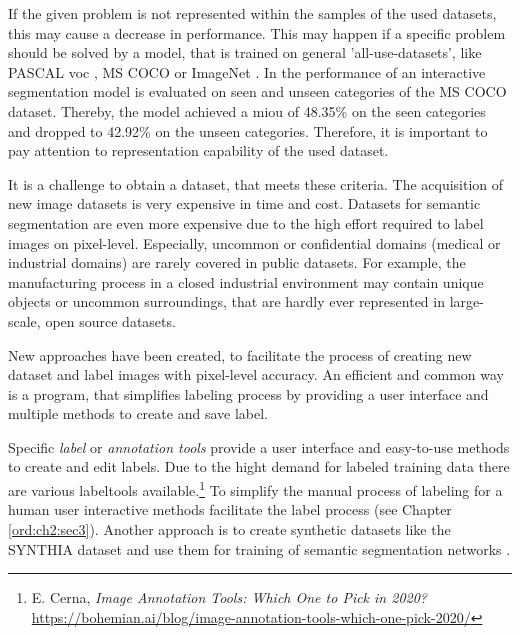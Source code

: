 \begin{itemize}
	If the given problem is not represented within the samples of the used datasets, this may cause a decrease in performance.
	This may happen if a specific problem should be solved by a model, that is trained on general 'all-use-datasets', like PASCAL \gls{voc} \cite{Eve20-PascalVOC}, MS COCO \cite{Lin14-Coco} or ImageNet \cite{Deng09-ImageNet}.
	In \cite{Xu16-InteractiveObjectSelection} the performance of an interactive segmentation model is evaluated on seen and unseen categories of the MS COCO dataset.
	Thereby, the model achieved a \gls{miou} of 48.35\% on the seen categories and dropped to 42.92\% on the unseen categories. 
	Therefore, it is important to pay attention to representation capability of the used dataset.
\end{itemize} 
It is a challenge to obtain a dataset, that meets these criteria.
The acquisition of new image datasets is very expensive in time and cost.
Datasets for semantic segmentation are even more expensive due to the high effort required to label images on pixel-level.
Especially, uncommon or confidential domains (\eg medical or industrial domains) are rarely covered in public datasets.
For example, the manufacturing process in a closed industrial environment may contain unique objects or uncommon surroundings, that are hardly ever represented in large-scale, open source datasets.

New approaches have been created, to facilitate the process of creating new dataset and label images with pixel-level accuracy.
An efficient and common way is a program, that simplifies labeling process by providing a user interface and multiple methods to create and save label.

Specific \textit{label} or \textit{annotation tools} provide a user interface and easy-to-use methods to create and edit labels. 
Due to the hight demand for labeled training data there are various labeltools available.\footnote{E. Cerna, \textit{Image Annotation Tools: Which One to Pick in 2020?} \url{https://bohemian.ai/blog/image-annotation-tools-which-one-pick-2020/}}
To simplify the manual process of labeling for a human user interactive methods facilitate the label process (see Chapter \ref{ord:ch2:sec3}).
Another approach is to create synthetic datasets like the SYNTHIA dataset \cite{Zol19-Temporal} and use them for training of semantic segmentation networks \cite{Chen18-SyntheticData}.


